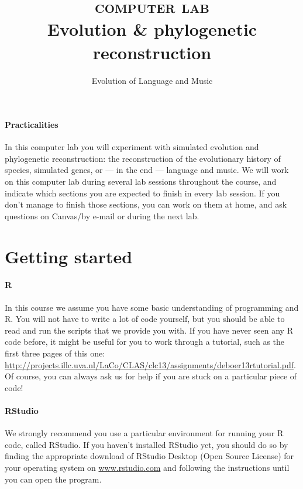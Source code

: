 \documentclass[a4paper, 9pt]{article}
\title{\textsc{computer lab}\\ \textbf{Evolution \& phylogenetic reconstruction}}
\author{Evolution of Language and Music}
\date{}
\begin{document}
\maketitle
{}


\paragraph{Practicalities}
In this computer lab you will experiment with simulated evolution and phylogenetic reconstruction: the reconstruction of the evolutionary history of species, simulated genes, or --- in the end --- language and music. 
We will work on this computer lab during several lab sessions throughout the course, and indicate which sections you are expected to finish in every lab session.
If you don't manage to finish those sections, you can work on them at home, and ask questions on Canvas/by e-mail or during the next lab.

\section{Getting started}

\paragraph{R} 
In this course we assume you have some basic understanding of programming and R. You will not have to write a lot of code yourself, but you should be able to read and run the scripts that we provide you with. If you have never seen any R code before, it might be useful for you to work through a tutorial, such as the first three pages of this one: \url{http://projects.illc.uva.nl/LaCo/CLAS/clc13/assignments/deboer13rtutorial.pdf}.
Of course, you can always ask us for help if you are stuck on a particular piece of code!

\paragraph{RStudio}
We strongly recommend you use a particular environment for running your R code, called RStudio. If you haven't installed RStudio yet, you should do so by finding the appropriate download of RStudio Desktop (Open Source License) for your operating system on \url{www.rstudio.com} and following the instructions until you can open the program.
\end{document}
